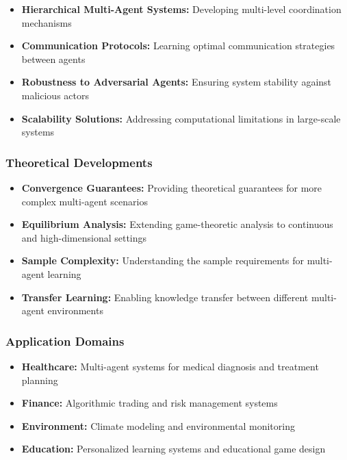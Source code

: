 \documentclass[conference]{IEEEtran}
\begin{document}
{{\begin{itemize}
    \item \textbf{Hierarchical Multi-Agent Systems:} Developing multi-level coordination mechanisms
    \item \textbf{Communication Protocols:} Learning optimal communication strategies between agents
    \item \textbf{Robustness to Adversarial Agents:} Ensuring system stability against malicious actors
    \item \textbf{Scalability Solutions:} Addressing computational limitations in large-scale systems
\end{itemize}

\subsubsection{Theoretical Developments}

\begin{itemize}
    \item \textbf{Convergence Guarantees:} Providing theoretical guarantees for more complex multi-agent scenarios
    \item \textbf{Equilibrium Analysis:} Extending game-theoretic analysis to continuous and high-dimensional settings
    \item \textbf{Sample Complexity:} Understanding the sample requirements for multi-agent learning
    \item \textbf{Transfer Learning:} Enabling knowledge transfer between different multi-agent environments
\end{itemize}

\subsubsection{Application Domains}

\begin{itemize}
    \item \textbf{Healthcare:} Multi-agent systems for medical diagnosis and treatment planning
    \item \textbf{Finance:} Algorithmic trading and risk management systems
    \item \textbf{Environment:} Climate modeling and environmental monitoring
    \item \textbf{Education:} Personalized learning systems and educational game design
\end{itemize}

}}
\end{document}
